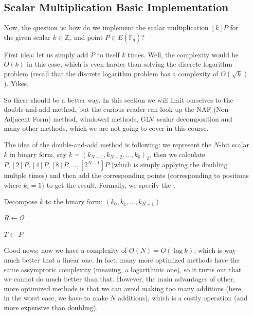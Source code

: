 \documentclass[../lecture-notes.tex]{subfiles}
\begin{document}
\subsection{Scalar Multiplication Basic Implementation}

Now, the question is: how do we implement the scalar multiplication $[k]P$ for the given scalar $k \in \mathbb{Z}_r$ and point $P \in E(\overline{\mathbb{F}}_q)$? 

First idea: let us simply add $P$ to itself $k$ times. Well, the complexity would be $O(k)$ in this case, which is even harder than solving the discrete logarithm problem (recall that the discrete logarithm problem has a complexity of $O(\sqrt{k})$). Yikes.

So there should be a better way. In this section we will limit ourselves to the double-and-add method, but the curious reader can look up the NAF (Non-Adjacent Form) method, windowed methods, GLV scalar decomposition and many other methods, which we are not going to cover in this course.

The idea of the double-and-add method is following: we represent the $N$-bit scalar $k$ in binary form, say $k = (k_{N-1},k_{N-2},\dots,k_0)_2$, then we calculate $P, [2]P, [4]P, [8]P, \dots, [2^{N-1}]P$ (which is simply applying the doubling multple times) and then add the corresponding points (corresponding to positions where $k_i=1$) to get the result. Formally, we specify the .

\begin{algorithm}
    \caption{Double-and-add method for scalar multiplication}\label{alg:double_and_add}
    
    Decompose $k$ to the binary form: $(k_0,k_1,\dots,k_{N-1})$
    
    $R \gets \mathcal{O}$
    
    $T \gets P$
    
    
\end{algorithm}    

Good news: now we have a complexity of $O(N)=O(\log k)$, which is way much better that a linear one. In fact, many more optimized methods have the same assymptotic complexity (meaning, a logarithmic one), so it turns out that 
we cannot do much better than that. However, the main advantages of other, more optimized methods is that we can avoid making too many additions (here, in the worst case, we have to make $N$ additions), which is a costly operation (and more expensive than doubling).
\end{document}

